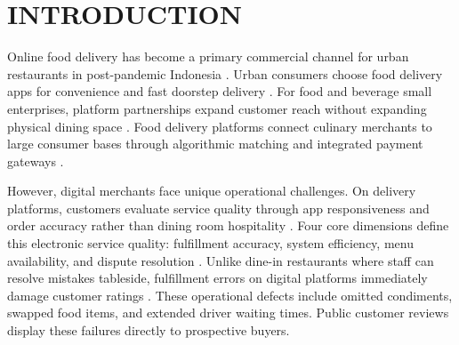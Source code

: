 \documentclass{jomas}
\begin{document}
\makejomasheader

\begin{abstract}
Online food delivery platforms require small restaurants to manage service quality and customer satisfaction effectively. This study analyzes electronic service quality, order fulfillment bottlenecks, and complaint management at Nasi Gerilya Restaurant on GrabFood in Medan City. We examine 4,584 GrabFood customer reviews, observe kitchen queue operations, and interview nine key informants across management, kitchen staff, cashiers, IT consultants, consumers, and competing restaurants. The restaurant maintains strong customer satisfaction through consistent food taste, generous meat portions, and responsive dish replacements. However, peak lunch hours create operational bottlenecks because dine-in customers, takeaway buyers, and delivery couriers crowd a single service counter. Packaging omissions, wrong food variants, and soup spillage cause recurring customer complaints. We map the order fulfillment process through a service blueprint and identify five operational failure points across e-service quality dimensions. We recommend a two-stage fail-safe packaging checklist, a separate courier dispatch station, and tamper-evident packaging to eliminate fulfillment errors and protect customer retention.
\end{abstract}

\section{INTRODUCTION}
Online food delivery has become a primary commercial channel for urban restaurants in post-pandemic Indonesia \parencite{elverda2025ofdindonesia}. Urban consumers choose food delivery apps for convenience and fast doorstep delivery \parencite{chaffey2022digitalmarketing}. For food and beverage small enterprises, platform partnerships expand customer reach without expanding physical dining space \parencite{kotler2023principlesmarketing}. Food delivery platforms connect culinary merchants to large consumer bases through algorithmic matching and integrated payment gateways \parencite{pigatto2017fooddelivery}.

However, digital merchants face unique operational challenges. On delivery platforms, customers evaluate service quality through app responsiveness and order accuracy rather than dining room hospitality \parencite{parasuraman2005esqual,zeithaml2002service}. Four core dimensions define this electronic service quality: fulfillment accuracy, system efficiency, menu availability, and dispute resolution \parencite{parasuraman2005esqual}. Unlike dine-in restaurants where staff can resolve mistakes tableside, fulfillment errors on digital platforms immediately damage customer ratings \parencite{santoso2023esatisfaction}. These operational defects include omitted condiments, swapped food items, and extended driver waiting times. Public customer reviews display these failures directly to prospective buyers.
\end{document}
